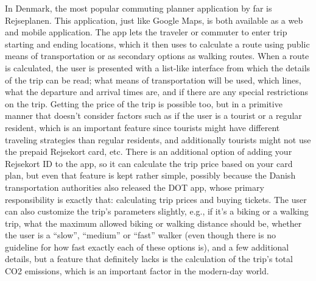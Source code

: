 In Denmark, the most popular commuting planner application by far is Rejseplanen.
This application, just like Google Maps, is both available as a web and mobile application.
The app lets the traveler or commuter to enter trip starting and ending locations, which it then uses to calculate a
route using public means of transportation or as secondary options as walking routes.
When a route is calculated, the user is presented with a list-like interface from which the details of the trip can be
read; what means of transportation will be used, which lines, what the departure and arrival times are, and if there are
any special restrictions on the trip.
Getting the price of the trip is possible too, but in a primitive manner that doesn't consider factors such as if the
user is a tourist or a regular resident, which is an important feature since tourists might have different traveling
strategies than regular residents, and additionally tourists might not use the prepaid Rejsekort card, etc.
There is an additional option of adding your Rejsekort ID to the app, so it can calculate the trip price based on your
card plan, but even that feature is kept rather simple, possibly because the Danish transportation authorities also
released the DOT app, whose primary responsibility is exactly that: calculating trip prices and buying tickets.
The user can also customize the trip’s parameters slightly, e.g., if it’s a biking or a walking trip, what the maximum
allowed biking or walking distance should be, whether the user is a “slow”, “medium” or “fast” walker (even though there
is no guideline for how fast exactly each of these options is), and a few additional details, but a feature that
definitely lacks is the calculation of the trip’s total CO2 emissions, which is an important factor in the modern-day
world.
